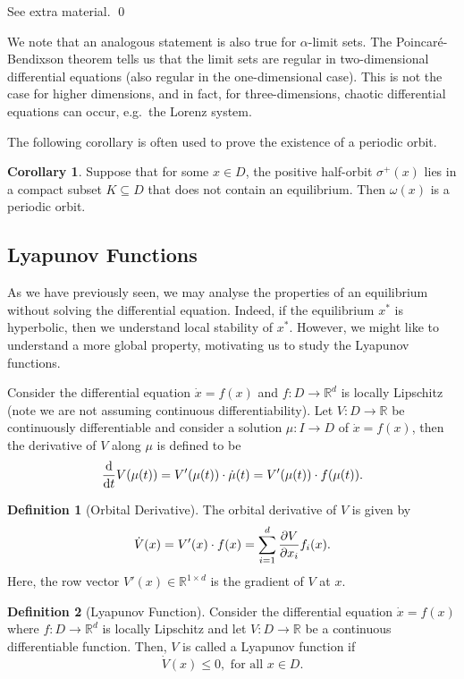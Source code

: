 \documentclass[
]{article}
\theoremstyle{definition}
\newtheorem{corollary}{Corollary}[theorem]
\theoremstyle{definition}
\newtheorem{definition}{Definition}[section]
\begin{document}
See extra material. \qed

We note that an analogous statement is also true for \(\alpha\)-limit
sets. The Poincaré-Bendixson theorem tells us that the limit sets are
regular in two-dimensional differential equations (also regular in the
one-dimensional case). This is not the case for higher dimensions, and
in fact, for three-dimensions, chaotic differential equations can occur,
e.g.~the Lorenz system.

The following corollary is often used to prove the existence of a
periodic orbit.

\begin{corollary}
  Suppose that for some \(x \in D\), the positive half-orbit \(\sigma^+(x)\) lies in 
  a compact subset \(K \subseteq D\) that does not contain an equilibrium. Then \(\omega(x)\) 
  is a periodic orbit. 
\end{corollary}

\hypertarget{lyapunov-functions}{%
\subsection{Lyapunov Functions}\label{lyapunov-functions}}

As we have previously seen, we may analyse the properties of an
equilibrium without solving the differential equation. Indeed, if the
equilibrium \(x^*\) is hyperbolic, then we understand local stability of
\(x^*\). However, we might like to understand a more global property,
motivating us to study the Lyapunov functions.

Consider the differential equation \(\dot x = f(x)\) and
\(f : D \to \mathbb{R}^d\) is locally Lipschitz (note we are not
assuming continuous differentiability). Let \(V : D \to \mathbb{R}\) be
continuously differentiable and consider a solution \(\mu : I \to D\) of
\(\dot x = f(x)\), then the derivative of \(V\) along \(\mu\) is defined
to be
\[\dv{t} V(\mu(t)) = V'(\mu(t)) \cdot \dot \mu(t) = V'(\mu(t)) \cdot f(\mu(t)).\]

\begin{definition}[Orbital Derivative]
  The orbital derivative of \(V\) is given by 
  \[\dot V(x) = V'(x) \cdot f(x) = \sum_{i = 1}^d \pdv{V}{x_i} f_i(x).\]
  Here, the row vector \(V'(x) \in \mathbb{R}^{1 \times d}\) is the gradient of 
  \(V\) at \(x\).
\end{definition}

\begin{definition}[Lyapunov Function]
  Consider the differential equation \(\dot x = f(x)\) where \(f : D \to \mathbb{R}^d\) 
  is locally Lipschitz and let \(V : D \to \mathbb{R}\) be a continuous differentiable 
  function. Then, \(V\) is called a Lyapunov function if 
  \[\dot V(x) \le 0, \text{ for all } x \in D.\]
\end{definition}
\end{document}
